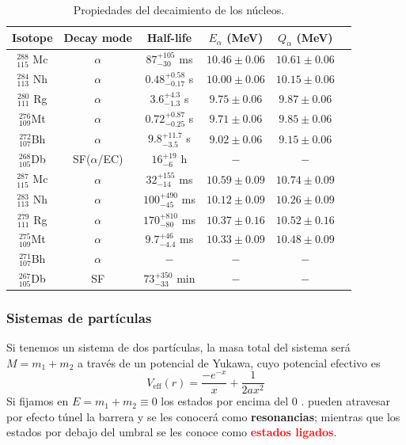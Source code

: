 \begin{table}[h!]
\centering
\begin{tabular}{|c |c |c |c |c |c|}
\hline
\textbf{Isotope} & \textbf{Decay mode} & \textbf{Half-life} & \textbf{$E_{\alpha}$ (MeV)} & \textbf{$Q_{\alpha}$ (MeV)} \\
\hline
$^{288}_{115}$ Mc& $\alpha$ & $87^{+105}_{-30}$ ms & $10.46 \pm 0.06$ & $10.61 \pm 0.06$ \\
$^{284}_{113}$ Nh& $\alpha$ & $0.48^{+0.58}_{-0.17}$ s & $10.00 \pm 0.06$ & $10.15 \pm 0.06$ \\
$^{280}_{111}$ Rg& $\alpha$ & $3.6^{+4.3}_{-1.3}$ s & $9.75 \pm 0.06$ & $9.87 \pm 0.06$ \\
$^{276}_{109}$Mt & $\alpha$ & $0.72^{+0.87}_{-0.25}$ s & $9.71 \pm 0.06$ & $9.85 \pm 0.06$ \\
$^{272}_{107}$Bh & $\alpha$ & $9.8^{+11.7}_{-3.5}$ s & $9.02 \pm 0.06$ & $9.15 \pm 0.06$ \\
$^{268}_{105}$Db & SF($\alpha$/EC) & $16^{+19}_{-6}$ h & $-$ & $-$ \\
\hline  \hline
$^{287}_{115}$ Mc& $\alpha$ & $32^{+155}_{-14}$ ms & $10.59 \pm 0.09$ & $10.74 \pm 0.09$ \\
$^{283}_{113}$ Nh& $\alpha$ & $100^{+490}_{-45}$ ms & $10.12 \pm 0.09$ & $10.26 \pm 0.09$ \\
$^{279}_{111}$ Rg& $\alpha$ & $170^{+810}_{-80}$ ms & $10.37 \pm 0.16$ & $10.52 \pm 0.16$ \\
$^{275}_{109}$Mt & $\alpha$ & $9.7^{+46}_{-4.4}$ ms & $10.33 \pm 0.09$ & $10.48 \pm 0.09$ \\
$^{271}_{107}$Bh & $\alpha$ & $-$ & $-$ & $-$ \\
$^{267}_{105}$Db & SF & $73^{+350}_{-33}$ min & $-$ & $-$ \\
\hline
\end{tabular}
\caption{Propiedades del decaimiento de los núcleos.}
\end{table}
\noindent  \begin{minipage}{0.6\textwidth}
    \subsubsection{Sistemas de partículas}
 Si tenemos un sistema de dos partículas, la masa total del sistema será $M=m_1+m_2$ a través de un potencial de Yukawa, cuyo potencial efectivo es 
\begin{equation}
    V_\mathrm{eff}(r)=\frac{-e^{-x}}{x}+\frac{1}{2ax^2}
    \label{eq: Potencial efectivo de Yukawa}
\end{equation}
Si fijamos en $E=m_1+m_2\equiv 0$ los estados por encima del 0 . pueden atravesar por efecto túnel la barrera y se les conocerá como \textcolor{applegreen}{\textbf{resonancias}}; mientras que los estados por debajo del umbral se les conoce como \textcolor{red}{\textbf{estados ligados}}.
\end{minipage}
